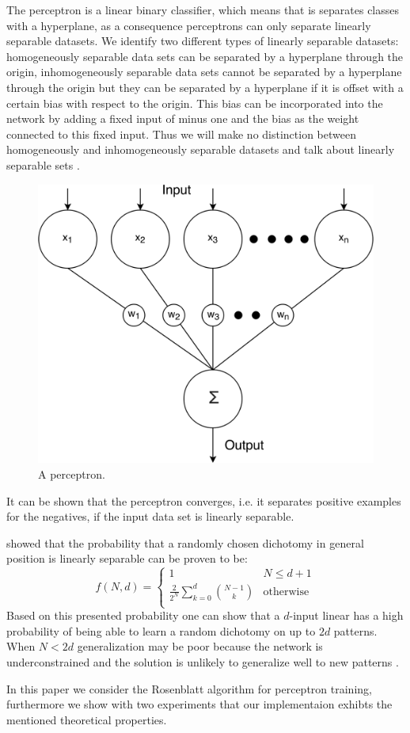 The perceptron is a linear binary classifier, which means that is separates classes with a hyperplane, as a consequence perceptrons can only separate linearly separable datasets. We identify two different types of linearly separable datasets: homogeneously separable data sets can be separated by a hyperplane through the origin, inhomogeneously separable data sets cannot be separated by a hyperplane through the origin but they can be separated by a hyperplane if it is offset with a certain bias with respect to the origin. This bias can be incorporated into the network by adding a fixed input of minus one and the bias as the weight connected to this fixed input. Thus we will make no distinction between homogeneously and inhomogeneously separable datasets and talk about linearly separable sets \cite{rojas1996neural}.
\begin{figure}[H]
	\centering
	\includegraphics[width=\columnwidth]{./img/perceptron}
	\caption{A perceptron.}
	\label{fig:1:perceptron}
\end{figure}
It can be shown that the perceptron converges, i.e. it separates positive examples for the negatives, if the input data set is linearly separable.

\textcite{cover1965geometrical} showed that the probability that a randomly chosen dichotomy  in general position is linearly separable can be proven to be:
	\begin{equation}\label{eq:1:lsChance}
		f(N,d) = 
		\begin{cases}
		1
		& N \leq d + 1\\
		\frac{2}{2^N} \displaystyle\sum_{k = 0}^{d} \binom{N - 1}{k}										
		& \text{otherwise}\\
		\end{cases}
	\end{equation}
Based on this presented probability one can show that a $d$-input linear has a high probability of being able to learn a random dichotomy on up to $2d$ patterns. When $N < 2d$ generalization may be poor because the network is underconstrained and the solution is unlikely to generalize well to new patterns \cite{reed1998neural}.

In this paper we consider the Rosenblatt algorithm for perceptron training, furthermore we show with two experiments that our implementaion exhibts the mentioned theoretical properties. 